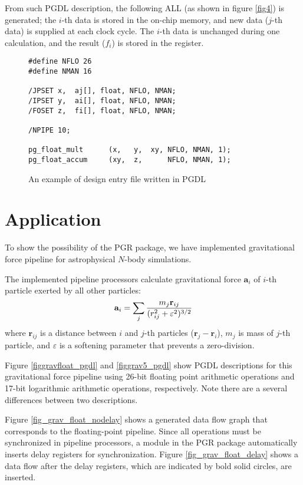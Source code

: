 \documentclass{llncs}
\begin{document}
From such PGDL description, the following ALL (as shown in figure \ref{fig4})
is generated; the $i$-th data is stored in the on-chip memory,
and new data ($j$-th data) is supplied at each clock cycle.
The $i$-th data is unchanged during one calculation, and 
the result ($f_i$) is stored in the register.

\begin{figure}
\scriptsize
\begin{verbatim}
#define NFLO 26
#define NMAN 16

/JPSET x,  aj[], float, NFLO, NMAN;
/IPSET y,  ai[], float, NFLO, NMAN;
/FOSET z,  fi[], float, NFLO, NMAN;

/NPIPE 10;

pg_float_mult      (x,   y,  xy, NFLO, NMAN, 1);
pg_float_accum     (xy,  z,      NFLO, NMAN, 1);
\end{verbatim}
\caption{An example of design entry file written in PGDL}
\label{fig5}
\end{figure}


\section{Application}
To show the possibility of the PGR package, we have implemented gravitational
force pipeline for astrophysical $N$-body simulations.

The implemented pipeline processors calculate gravitational force 
$\mathbf{a}_i$ of $i$-th particle exerted by all other particles:
\begin{equation}
\mathbf{ a}_i = \sum_j {m_j \mathbf{ r}_{ij} \over (r_{ij}^2 + \varepsilon^2)^{3/2}}
\end{equation}
where $\mathbf{r}_{ij}$ is a distance between $i$ and $j$-th particles
($\mathbf{r}_j - \mathbf{r}_i $), 
$m_{j}$ is mass of $j$-th particle, and $\varepsilon$ is a softening parameter
that prevents a zero-division.

Figure \ref{figgravfloat_pgdl} and \ref{figgrav5_pgdl}
show PGDL descriptions for this gravitational force pipeline
using 26-bit floating point arithmetic operations and
17-bit logarithmic arithmetic operations, respectively.
Note there are a several differences between two descriptions.

Figure \ref{fig_grav_float_nodelay} shows a generated 
data flow graph that corresponds to the floating-point pipeline.
Since all operations must be synchronized in pipeline processors, 
a module in the PGR package automatically inserts
delay registers for synchronization.
Figure \ref{fig_grav_float_delay} shows a data flow
after the delay registers, which are indicated by bold solid circles, are inserted.
\end{document}

